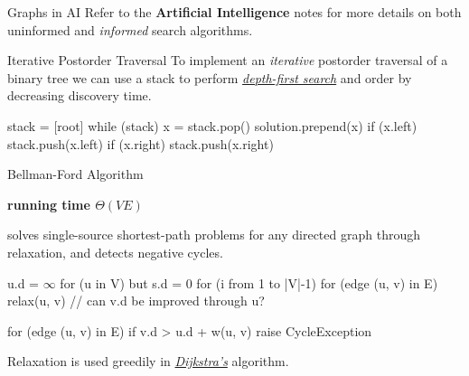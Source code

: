 \documentclass{cognito}
\begin{document}

\begin{note}{Graphs in AI}
	Refer to the \textbf{Artificial Intelligence} \noteref notes for more details on both uninformed and \emph{informed} search
	algorithms.
	
\end{note}

\begin{note}{Iterative Postorder Traversal}
	To implement an {\it iterative} postorder traversal of
	a binary tree we can use a stack to perform \hyperref[note:Depth-First Search]{\it depth-first search}
	and order by decreasing discovery time.
	\begin{largecode}
 stack = [root]
 while (stack)
 	x = stack.pop()
	solution.prepend(x)
	if (x.left) stack.push(x.left)
	if (x.right) stack.push(x.right)
	\end{largecode}
	\vspace{-5pt}
\end{note}


\begin{note}{Bellman-Ford Algorithm}
	\begin{mdframed}[linecolor=black!25!white]
		\bf running time $\Theta(V E)$
	\end{mdframed}
	 solves single-source shortest-path problems for any directed graph through relaxation, and detects negative cycles.
	\begin{largecode}
 u.d = $\infty$ for (u in V) but s.d = 0
 for (i from 1 to |V|-1)
	for (edge (u, v) in E)
		relax(u, v)  // can v.d be improved through u?

 for (edge (u, v) in E)
	if v.d > u.d + w(u, v) raise CycleException
	\end{largecode}
	\begin{remark} Relaxation is used greedily in \hyperref[note:Dijkstra's Algorithm]{\it Dijkstra's} algorithm.\end{remark}
	\vspace{-5pt}
\end{note}
\end{document}
